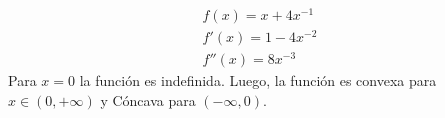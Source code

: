 \begin{homeworkProblem}

\begin{align*}
    f(x) = x + 4x^{-1}\\
    f'(x) = 1 - 4x^{-2}\\
    f''(x) = 8x^{-3}
\end{align*}
Para $x=0$ la función es indefinida. Luego, la función es convexa para $x \in (0,+\infty)$ y Cóncava para $(-\infty,0)$.
\end{homeworkProblem}